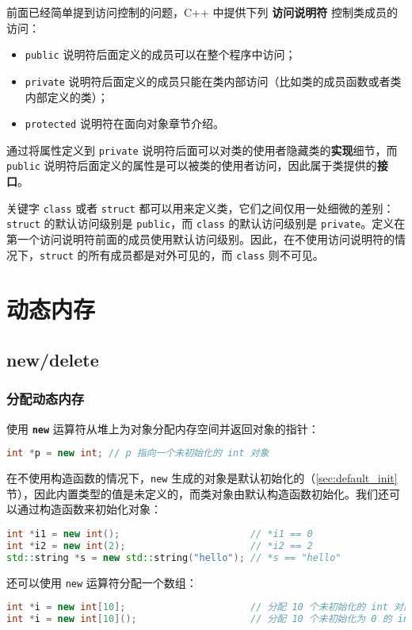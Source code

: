 \documentclass[hyperref,UTF8]{article}
\begin{document}
前面已经简单提到访问控制的问题，C++ 中提供下列 \textbf{访问说明符} 控制类成员的访问：

\begin{itemize}
  \item \texttt{public} 说明符后面定义的成员可以在整个程序中访问；
  \item \texttt{private} 说明符后面定义的成员只能在类内部访问（比如类的成员函数或者类内部定义的类）；
  \item \texttt{protected} 说明符在面向对象章节介绍。
\end{itemize}

通过将属性定义到 \texttt{private} 说明符后面可以对类的使用者隐藏类的\textbf{实现}细节，而 \texttt{public} 说明符后面定义的属性是可以被类的使用者访问，因此属于类提供的\textbf{接口}。

关键字 \texttt{class} 或者 \texttt{struct} 都可以用来定义类，它们之间仅用一处细微的差别：\texttt{struct} 的默认访问级别是 \texttt{public}，而 \texttt{class} 的默认访问级别是 \texttt{private}。定义在第一个访问说明符前面的成员使用默认访问级别。因此，在不使用访问说明符的情况下，\texttt{struct} 的所有成员都是对外可见的，而 \texttt{class} 则不可见。

\section{动态内存}

\subsection{new/delete}

\subsubsection{分配动态内存}

使用 \textbf{\texttt{new}} 运算符从堆上为对象分配内存空间并返回对象的指针：
\begin{lstlisting}[language=c++,numbers=none]
int *p = new int; // p 指向一个未初始化的 int 对象
\end{lstlisting}
在不使用构造函数的情况下，\texttt{new} 生成的对象是默认初始化的（\ref{sec:default_init} 节），因此内置类型的值是未定义的，而类对象由默认构造函数初始化。我们还可以通过构造函数来初始化对象：
\begin{lstlisting}[language=c++]
int *i1 = new int();                       // *i1 == 0
int *i2 = new int(2);                      // *i2 == 2
std::string *s = new std::string("hello"); // *s == "hello"
\end{lstlisting}
还可以使用 \texttt{new} 运算符分配一个数组：
\begin{lstlisting}[language=c++]
int *i = new int[10];                      // 分配 10 个未初始化的 int 对象
int *i = new int[10]();                    // 分配 10 个未初始化为 0 的 int 对象
\end{lstlisting}
\end{document}
